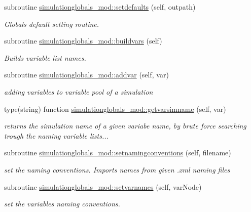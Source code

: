 \begin{DoxyCompactItemize}
\item 
subroutine \mbox{\hyperlink{namespacesimulationglobals__mod_aa01e0a958ef2e94a02991dcfe390bfa0}{simulationglobals\+\_\+mod\+::setdefaults}} (self, outpath)
\begin{DoxyCompactList}\small\item\em Globals default setting routine. \end{DoxyCompactList}\item 
subroutine \mbox{\hyperlink{namespacesimulationglobals__mod_a4aa829af1699c705e46f47bb023ac162}{simulationglobals\+\_\+mod\+::buildvars}} (self)
\begin{DoxyCompactList}\small\item\em Builds variable list names. \end{DoxyCompactList}\item 
subroutine \mbox{\hyperlink{namespacesimulationglobals__mod_afd372c5764a180f9029d4dc3cddce94d}{simulationglobals\+\_\+mod\+::addvar}} (self, var)
\begin{DoxyCompactList}\small\item\em adding variables to variable pool of a simulation \end{DoxyCompactList}\item 
type(string) function \mbox{\hyperlink{namespacesimulationglobals__mod_ac83c53dd4e998e653981c7b1fa5dacbd}{simulationglobals\+\_\+mod\+::getvarsimname}} (self, var)
\begin{DoxyCompactList}\small\item\em returns the simulation name of a given variabe name, by brute force searching trough the naming variable lists... \end{DoxyCompactList}\item 
subroutine \mbox{\hyperlink{namespacesimulationglobals__mod_affd52c4c7b1c3f7ce282eeb7e4b4a359}{simulationglobals\+\_\+mod\+::setnamingconventions}} (self, filename)
\begin{DoxyCompactList}\small\item\em set the naming conventions. Imports names from given .xml naming files \end{DoxyCompactList}\item 
subroutine \mbox{\hyperlink{namespacesimulationglobals__mod_a2c6fa0a9123d06b2110258ea200f4f52}{simulationglobals\+\_\+mod\+::setvarnames}} (self, var\+Node)
\begin{DoxyCompactList}\small\item\em set the variables naming conventions. \end{DoxyCompactList}\item 

\end{DoxyCompactItemize}
